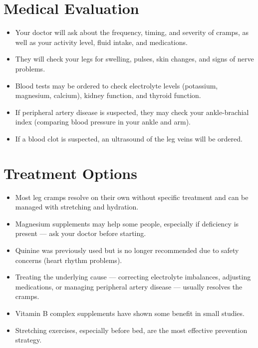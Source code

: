 \section*{Medical Evaluation}
\begin{itemize}
  \item Your doctor will ask about the frequency, timing, and severity of cramps, as well as your activity level, fluid intake, and medications.
  \item They will check your legs for swelling, pulses, skin changes, and signs of nerve problems.
  \item Blood tests may be ordered to check electrolyte levels (potassium, magnesium, calcium), kidney function, and thyroid function.
  \item If peripheral artery disease is suspected, they may check your ankle-brachial index (comparing blood pressure in your ankle and arm).
  \item If a blood clot is suspected, an ultrasound of the leg veins will be ordered.
\end{itemize}

\section*{Treatment Options}
\begin{itemize}
  \item Most leg cramps resolve on their own without specific treatment and can be managed with stretching and hydration.
  \item Magnesium supplements may help some people, especially if deficiency is present — ask your doctor before starting.
  \item Quinine was previously used but is no longer recommended due to safety concerns (heart rhythm problems).
  \item Treating the underlying cause — correcting electrolyte imbalances, adjusting medications, or managing peripheral artery disease — usually resolves the cramps.
  \item Vitamin B complex supplements have shown some benefit in small studies.
  \item Stretching exercises, especially before bed, are the most effective prevention strategy.
\end{itemize}

